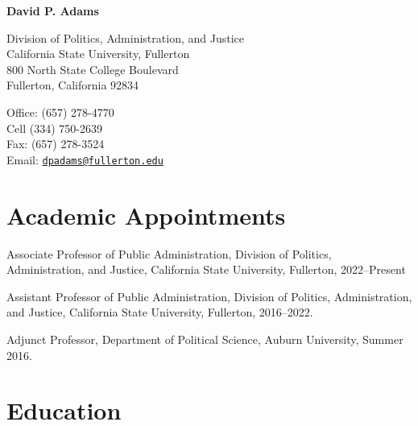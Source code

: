\documentclass[11pt,letterpaper]{article}
\def\name{David P. Adams}
\renewenvironment{itemize}{
  \begin{list}{}{
    \setlength{\leftmargin}{1.5em}
    \setlength{\itemsep}{0.25em}
    \setlength{\parskip}{0pt}
    \setlength{\parsep}{0.25em}
  }
}{
  \end{list}
}
\begin{document}
	
	
\centerline{\huge \bf \name}
\smallskip

\bigskip

\begin{minipage}[t]{0.495\textwidth}
  Division of Politics, Administration, and Justice \\
  California State University, Fullerton \\
  800 North State College Boulevard  \\
  Fullerton, California 92834
\end{minipage}
\hspace{1.25in}
\begin{minipage}[t]{0.495\textwidth}
  Office: (657) 278-4770 \\
  Cell \hspace{.75em} (334) 750-2639 \\
  Fax: \hspace{1em}(657) 278-3524 \\
  Email: \href{mailto:dpadams@fullerton.edu}{\texttt{dpadams@fullerton.edu}}
\end{minipage}

\section*{Academic Appointments}

	\begin{itemize}\leftmargin=2pt\itemindent=-15pt
		\item Associate Professor of Public Administration, Division of Politics, Administration, and Justice, California State University, Fullerton, 2022--Present
		\item Assistant Professor of Public Administration, Division of Politics, Administration, and Justice, California State University, Fullerton,  2016--2022.
		\item Adjunct Professor, Department of Political Science, Auburn University, Summer 2016.
	\end{itemize}

\section*{Education}
\end{document}

